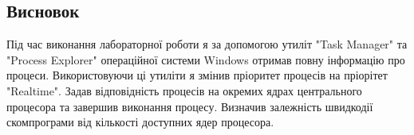 \documentclass{article}
\begin{document}
\begin{normalsize}
	\section*{Висновок}
	Під час виконання лабораторної роботи я за допомогою утиліт "Task Manager" та "Process Explorer" операційної системи Windows отримав повну інформацію про процеси. Використовуючи ці утиліти я змінив пріоритет процесів на пріорітет "Realtime". Задав відповідність процесів на окремих ядрах центрального процесора та завершив виконання процесу. Визначив залежність швидкодії скомпрограми від кількості доступних ядер процесора.
	    
\end{normalsize}
\end{document}
